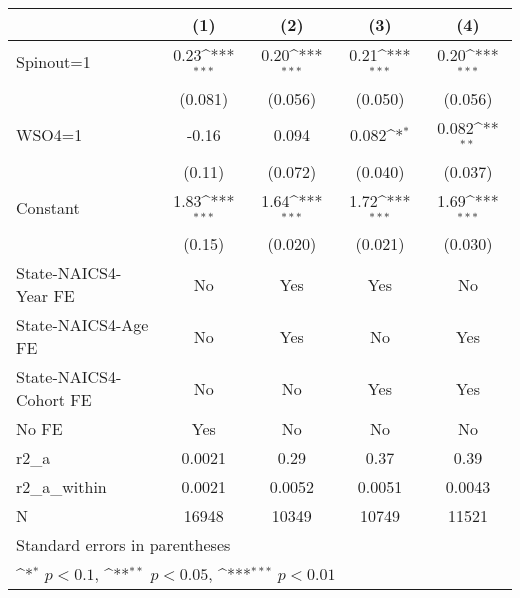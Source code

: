 {
\def\sym#1{\ifmmode^{#1}\else\(^{#1}\)\fi}
\begin{tabular}{l*{4}{c}}
\hline\hline
                    &\multicolumn{1}{c}{(1)}         &\multicolumn{1}{c}{(2)}         &\multicolumn{1}{c}{(3)}         &\multicolumn{1}{c}{(4)}         \\
\hline
Spinout=1           &        0.23\sym{***}&        0.20\sym{***}&        0.21\sym{***}&        0.20\sym{***}\\
                    &     (0.081)         &     (0.056)         &     (0.050)         &     (0.056)         \\
[1em]
WSO4=1              &       -0.16         &       0.094         &       0.082\sym{*}  &       0.082\sym{**} \\
                    &      (0.11)         &     (0.072)         &     (0.040)         &     (0.037)         \\
[1em]
Constant            &        1.83\sym{***}&        1.64\sym{***}&        1.72\sym{***}&        1.69\sym{***}\\
                    &      (0.15)         &     (0.020)         &     (0.021)         &     (0.030)         \\
[1em]
State-NAICS4-Year FE&          No         &         Yes         &         Yes         &          No         \\
[1em]
State-NAICS4-Age FE &          No         &         Yes         &          No         &         Yes         \\
[1em]
State-NAICS4-Cohort FE&          No         &          No         &         Yes         &         Yes         \\
[1em]
No FE               &         Yes         &          No         &          No         &          No         \\
\hline
r2\_a                &      0.0021         &        0.29         &        0.37         &        0.39         \\
r2\_a\_within         &      0.0021         &      0.0052         &      0.0051         &      0.0043         \\
N                   &       16948         &       10349         &       10749         &       11521         \\
\hline\hline
\multicolumn{5}{l}{\footnotesize Standard errors in parentheses}\\
\multicolumn{5}{l}{\footnotesize \sym{*} \(p<0.1\), \sym{**} \(p<0.05\), \sym{***} \(p<0.01\)}\\
\end{tabular}
}

